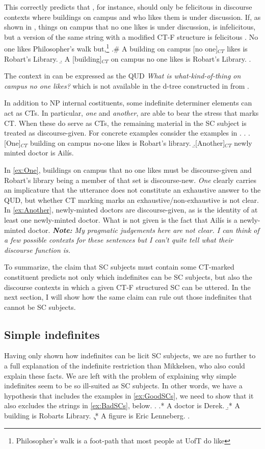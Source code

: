\documentclass[GPFinal]{subfiles}
\begin{document}
This correctly predicts that \LLast[b], for instance, should only be felicitous in discourse contexts where buildings on campus and who likes them is under discussion.
If, as shown in \Next, things on campus that no one likes is under discussion, \LLast[b] is infelicitous, but a version of the same string with a modified CT-F structure is felicitous
\ex. No one likes Philosopher's walk but,\footnote{Philosopher's walk is a foot-path that most people at UofT do like}
\a.\# A building on campus [no one]$_{CT}$ likes is Robart's Library.
\b. A [building]$_{CT}$ on campus no one likes is Robart's Library.
\z.

The context in \Last can be expressed as the QUD \textit{What is what-kind-of-thing on campus no one likes?} which is not available in the d-tree constructed in \LLast from \Last[a].

In addition to NP internal costituents, some indefinite determiner elements can act as CTs.
In particular, \textit{one} and \textit{another}, are able to bear the stress that marks CT.
When these do serve as CTs, the remaining material in the SC subject is treated as discourse-given.
For concrete examples consider the examples in \Next.
\ex.
\a.\label{ex:One} [One]$_{CT}$ building on campus no-one likes is Robart's library.
\b.\label{ex:Another}[Another]$_{CT}$ newly minted doctor is Ail\'is.

In \ref{ex:One}, buildings on campus that no one likes must be discourse-given and Robart's library being a member of that set is discourse-new.
\textit{One} clearly carries an implicature that the utterance does not constitute an exhaustive answer to the QUD, but whether CT marking marks an exhaustive/non-exhaustive is not clear.
In \ref{ex:Another}, newly-minted doctors are discourse-given, as is the identity of at least one newly-minted doctor.
What is not given is the fact that Ail\'is is a newly-minted doctor.
\textit{
  \textbf{
    Note:
  }
  My pragmatic judgements here are not clear.
  I can think of a few possible contexts for these sentences but I can't quite tell what their discourse function is.
}

To summarize, the claim that SC subjects must contain some CT-marked constituent predicts not only which indefinites can be SC subjects, but also the discourse contexts in which a given CT-F structured SC can be uttered.
In the next section, I will show how the same claim can rule out those indefinites that cannot be SC subjects.
\subsection{Simple indefinites}
Having only shown how indefinites can be licit SC subjects, we are no further to a full explanation of the indefinite restriction than Mikkelsen, who also could explain these facts.
We are left with the problem of explaining why simple indefinites seem to be so ill-suited as SC subjects.
In other words, we have a hypothesis that includes the examples in \ref{ex:GoodSCs}, we need to show that it also excludes the strings in \ref{ex:BadSCs}, below.
\ex.\label{ex:BadSCs}
\a.* A doctor is Derek.
\b.* A building is Robarts Library.
\c.* A figure is Eric Lenneberg.
\z.
\end{document}
